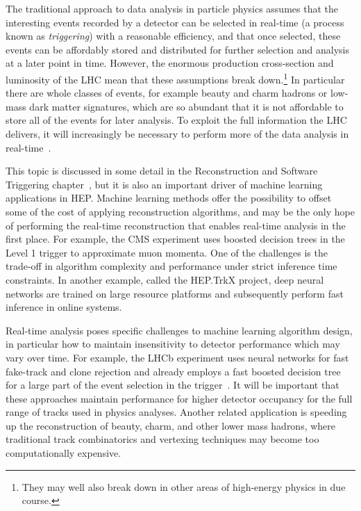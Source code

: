 The traditional approach to data analysis in particle physics assumes that the interesting events recorded by a detector can be selected in real-time (a process known as \emph{triggering}) with a reasonable efficiency, and that once selected, these events can be affordably stored and distributed for further selection and analysis at a later point in time.
However, the enormous production cross-section and luminosity of the LHC mean that these assumptions break down.\footnote{They may well also break down in other areas of high-energy physics in due course.}
In particular there are whole classes of events, for example beauty and charm hadrons or low-mass dark matter signatures, which are so abundant that it is not affordable to store all of the events for later analysis. To exploit the full information the LHC delivers, it will increasingly be necessary to perform more of the data analysis in real-time~\cite{1742-6596-664-8-082004}.

This topic is discussed in some detail in the Reconstruction and Software Triggering chapter~\cite{recoCWP}, but it is also an important driver of machine learning applications in HEP. Machine learning methods offer the possibility to offset some of the cost of applying reconstruction algorithms, and may be the only hope of performing the real-time reconstruction that enables real-time analysis in the first place. For example, the CMS experiment uses boosted decision trees in the Level 1 trigger to approximate muon momenta. One of the challenges is the trade-off in algorithm complexity and performance under strict inference time constraints. In another example, called the HEP.TrkX project, deep neural networks are trained on large resource platforms and subsequently perform fast inference in online systems.

Real-time analysis poses specific challenges to machine learning algorithm design, in particular how to maintain insensitivity to detector performance which may vary over time. For example, the LHCb experiment uses neural networks for fast fake-track and clone rejection and already employs a fast boosted decision tree for a large part of the event selection in the trigger~\cite{Gligorov:2012qt}. It will be important that these approaches maintain performance for higher detector occupancy for the full range of tracks used in physics analyses. Another related application is speeding up the reconstruction of beauty, charm, and other lower mass hadrons, where traditional track combinatorics and vertexing techniques may become too computationally expensive.

